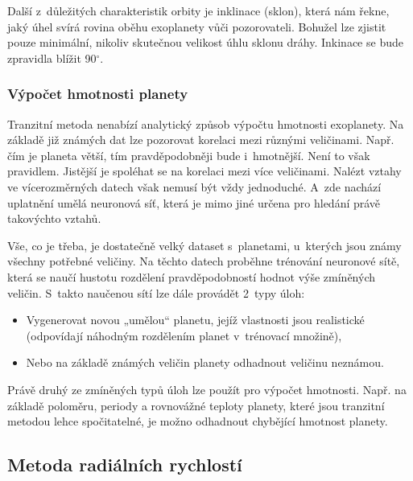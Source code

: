 \documentclass[a4paper,12pt]{article}
\begin{document}
{{Další z~důležitých charakteristik orbity je inklinace (sklon), která nám řekne, jaký úhel svírá rovina oběhu exoplanety vůči pozorovateli. Bohužel lze zjistit pouze minimální, nikoliv skutečnou velikost úhlu sklonu dráhy. Inkinace se bude zpravidla blížit 90$^{\circ}$.~\cite{transitprops}


\subsubsection{Výpočet hmotnosti planety}

Tranzitní metoda nenabízí analytický způsob výpočtu hmotnosti exoplanety. Na základě již známých dat lze pozorovat korelaci mezi různými veličinami. Např. čím je planeta větší, tím pravděpodobněji bude i~hmotnější. Není to však pravidlem. Jistější je spoléhat se na korelaci mezi více veličinami. Nalézt vztahy ve vícerozměrných datech však nemusí být vždy jednoduché. A~zde nachází uplatnění umělá neuronová síť, která je mimo jiné určena pro hledání právě takovýchto vztahů.~\cite{nnmass}

Vše, co je třeba, je dostatečně velký dataset s~planetami, u~kterých jsou známy všechny potřebné veličiny. Na těchto datech proběhne trénování neuronové sítě, která se naučí hustotu rozdělení pravděpodobností hodnot výše zmíněných veličin. S~takto naučenou sítí lze dále provádět 2~typy úloh:

\begin{itemize}
\item Vygenerovat novou „umělou“ planetu, jejíž vlastnosti jsou realistické (odpovídají náhodným rozdělením planet v~trénovací množině),

\item Nebo na základě známých veličin planety odhadnout veličinu neznámou.
\end{itemize}

Právě druhý ze zmíněných typů úloh lze použít pro výpočet hmotnosti. Např. na základě poloměru, periody a rovnovážné teploty planety, které jsou tranzitní metodou lehce spočitatelné, je možno odhadnout chybějící hmotnost planety.~\cite{nnmass}

\clearpage
\subsection{Metoda radiálních rychlostí}

}}
\end{document}

